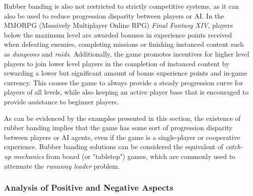 Rubber banding is also not restricted to strictly competitive systems, as it can also be used to reduce progression disparity between players or AI. In the MMORPG (Massively Multiplayer Online RPG) \emph{Final Fantasy XIV}, players below the maximum level are awarded bonuses in experience points received when defeating enemies, completing missions or finishing instanced content such as \emph{dungeons} and \emph{raids}. Additionally, the game promotes incentives for higher level players to join lower level players in the completion of instanced content by rewarding a lower but significant amount of bonus experience points and in-game currency. This causes the game to always provide a steady progression curve for players of all levels, while also keeping an active player base that is encouraged to provide assistance to beginner players.

As can be evidenced by the examples presented in this section, the existence of rubber banding implies that the game has some sort of progression disparity between players or AI agents, even if the game is a single-player or cooperative experience. Rubber banding solutions can be considered the equivalent of \emph{catch-up mechanics} from board (or "tabletop") games, which are commonly used to attenuate the \emph{runaway leader} problem.


\subsubsection{Analysis of Positive and Negative Aspects}

